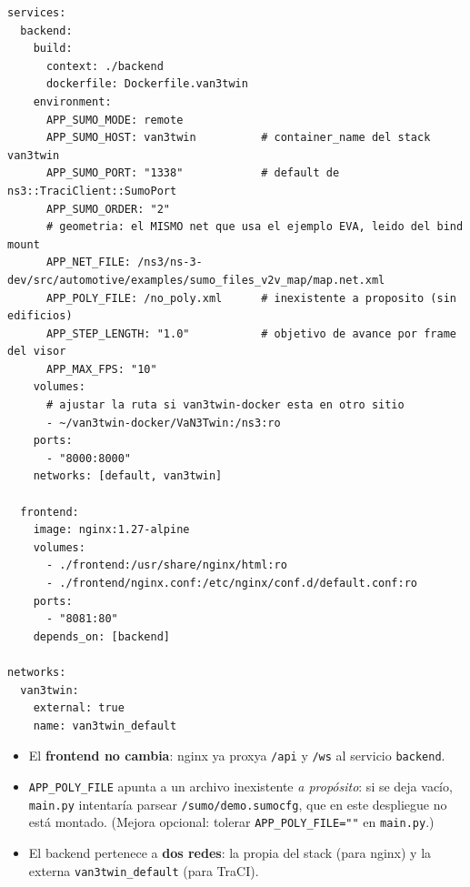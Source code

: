 \documentclass[11pt,a4paper]{article}
\begin{document}
\begin{enrepo}
\begin{lstlisting}
services:
  backend:
    build:
      context: ./backend
      dockerfile: Dockerfile.van3twin
    environment:
      APP_SUMO_MODE: remote
      APP_SUMO_HOST: van3twin          # container_name del stack van3twin
      APP_SUMO_PORT: "1338"            # default de ns3::TraciClient::SumoPort
      APP_SUMO_ORDER: "2"
      # geometria: el MISMO net que usa el ejemplo EVA, leido del bind mount
      APP_NET_FILE: /ns3/ns-3-dev/src/automotive/examples/sumo_files_v2v_map/map.net.xml
      APP_POLY_FILE: /no_poly.xml      # inexistente a proposito (sin edificios)
      APP_STEP_LENGTH: "1.0"           # objetivo de avance por frame del visor
      APP_MAX_FPS: "10"
    volumes:
      # ajustar la ruta si van3twin-docker esta en otro sitio
      - ~/van3twin-docker/VaN3Twin:/ns3:ro
    ports:
      - "8000:8000"
    networks: [default, van3twin]

  frontend:
    image: nginx:1.27-alpine
    volumes:
      - ./frontend:/usr/share/nginx/html:ro
      - ./frontend/nginx.conf:/etc/nginx/conf.d/default.conf:ro
    ports:
      - "8081:80"
    depends_on: [backend]

networks:
  van3twin:
    external: true
    name: van3twin_default
\end{lstlisting}
\end{enrepo}

\begin{notabox}
\begin{itemize}[leftmargin=1.4em, itemsep=1pt]
  \item El \textbf{frontend no cambia}: nginx ya proxya \texttt{/api} y \texttt{/ws} al
        servicio \texttt{backend}.
  \item \texttt{APP\_POLY\_FILE} apunta a un archivo inexistente \emph{a propósito}: si se
        deja vacío, \texttt{main.py} intentaría parsear \texttt{/sumo/demo.sumocfg}, que en
        este despliegue no está montado. (Mejora opcional: tolerar
        \texttt{APP\_POLY\_FILE=""} en \texttt{main.py}.)
  \item El backend pertenece a \textbf{dos redes}: la propia del stack (para nginx) y la
        externa \texttt{van3twin\_default} (para TraCI).
\end{itemize}
\end{notabox}

\end{document}
